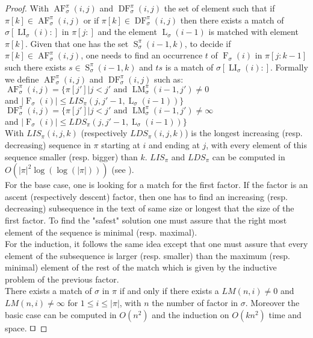 \documentclass[a4paper]{llncs}
\newcommand{\ptext}{\pi}
\newcommand{\pmotif}{\sigma}
\newcounter{num}
\DeclareMathOperator{\firsta}{L}
\newcommand{\first}[2]{\firsta_{{#1}}({#2})}
\DeclareMathOperator{\firstia}{LI}
\newcommand{\firsti}[2]{\firstia_{{#1}}({#2})}
\DeclareMathOperator{\factora}{F}
\newcommand{\factor}[2]{\factora_{{#1}}({#2})}
\DeclareMathOperator{\LMa}{LM}
\newcommand{\LM}[4]{\LMa_{{#1}}^{{#2}}(#3,#4)}
\DeclareMathOperator{\AFa}{AF}
\newcommand{\AF}[4]{\AFa_{{#1}}^{{#2}}(#3,#4)}
\DeclareMathOperator{\DFa}{DF}
\newcommand{\DF}[4]{\DFa_{{#1}}^{{#2}}(#3,#4)}
\DeclareMathOperator{\SETa}{S}
\newcommand{\SET}[4]{\SETa_{{#1}}^{{#2}}({#3},{#4})}
\begin{document}
\begin{proof}
With $\AF{\pmotif}{\ptext}{i}{j}$ and $\DF{\pmotif}{\ptext}{i}{j}$ the set of element such that if  $\ptext[k] \in \AF{\pmotif}{\ptext}{i}{j}$ or if $\ptext[k] \in \DF{\pmotif}{\ptext}{i}{j}$ then there exists a match of $\pmotif[\firsti{\pmotif}{i}:]$ in $\ptext[j:]$ and the element $\first{\pmotif}{i-1}$ is matched with element $\ptext[k]$. Given that one has the set $\SET{\pmotif}{\ptext}{i-1}{k}$, to decide if $\ptext[k] \in \AF{\pmotif}{\ptext}{i}{j}$, one needs to find an occurrence $t$ of $\factor{\pmotif}{i}$ in $\ptext[j:k-1]$ such there exists $s \in \SET{\pmotif}{\ptext}{i-1}{k}$ and $ts$ is a match of $\pmotif[\firsti{\pmotif}{i}:]$. 
Formally we define $\AF{\pmotif}{\ptext}{i}{j}$ and $\DF{\pmotif}{\ptext}{i}{j}$ such as:\\



$\AF{\pmotif}{\ptext}{i}{j}=\{\ptext[j']|\text{$j<j'$ and $\LM{\pmotif}{\ptext}{i-1}{j'} \neq 0$}$ \\
\indent \indent \indent and  $|\factor{\pmotif}{i}| \leq LIS_{\ptext}(j,j'-1,\first{\pmotif}{i-1})\}$ \\

$\DF{\pmotif}{\ptext}{i}{j}=\{\ptext[j']|\text{$j<j'$ and $\LM{\pmotif}{\ptext}{i-1}{j'} \neq \infty$}$ \\
\indent \indent \indent and  $|\factor{\pmotif}{i}| \leq LDS_{\ptext}(j,j'-1,\first{\pmotif}{i-1}) \}$ \\

With $LIS_{\ptext}(i,j,k)$ (respectively $LDS_{\ptext}(i,j,k)$) is the longest increasing (resp. decreasing) sequence in $\ptext$ starting at $i$ and ending at $j$,
with every element of this sequence
smaller (resp. bigger) than $k$.
$LIS_{\ptext}$ and $LDS_{\ptext}$ can be computed in $O(|\ptext|^2\log(\log(|\ptext|)))$ (see \cite{Bespamyatnikh00enumeratinglongest}).\\

For the base case,
one is looking for a match for the first factor.
If the factor is an ascent (respectively descent) factor, then
one has to find an increasing (resp. decreasing) subsequence
in the text of same size or longest that
the size of the first factor.
To find the "safest" solution
one must assure that the right most element
of the sequence is minimal (resp. maximal).\\
For the induction, it follows the same idea
except that one must assure that
every element of the subsequence is larger (resp. smaller)
than the maximum (resp. minimal) element of the rest of the match which is given by the inductive problem of
the previous factor.\\

There exists a match of $\pmotif$ in $\ptext$ if and only if
there exists a $LM(n,i)\neq 0$ and $LM(n,i)\neq \infty$ for $1 \leq i \leq |\ptext|$,
with $n$ the number of factor in $\pmotif$.
Moreover the basic case can be computed in $O(n^2)$
and the induction on $O(kn^2)$ time and space.
$\qed$
\end{proof}
\end{document}
